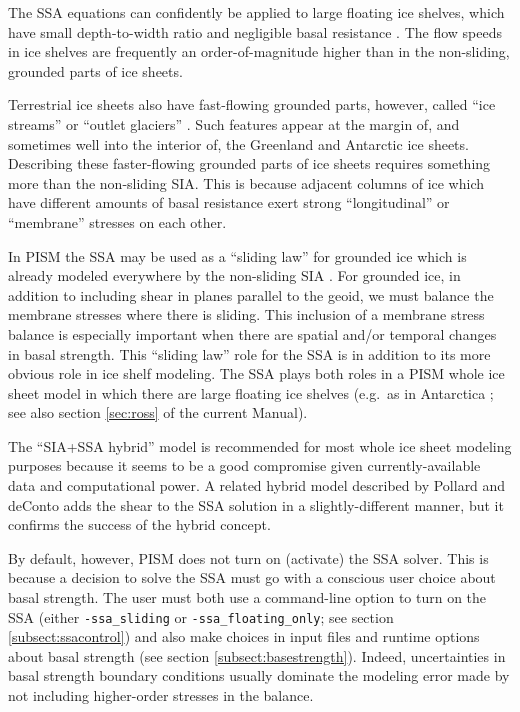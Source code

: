 The SSA equations can confidently be applied to large floating ice shelves, which have small depth-to-width ratio and negligible basal resistance \cite{Morland,MorlandZainuddin}.  The flow speeds in ice shelves are frequently an order-of-magnitude higher than in the non-sliding, grounded parts of ice sheets.

Terrestrial ice sheets also have fast-flowing grounded parts, however, called ``ice streams'' or ``outlet glaciers'' \cite{TrufferEchelmeyer}.  Such features appear at the margin of, and sometimes well into the interior of, the Greenland \cite{Joughinetal2001} and Antarctic \cite{BamberVaughanJoughin} ice sheets.  Describing these faster-flowing grounded parts of ice sheets requires something more than the non-sliding SIA.  This is because adjacent columns of ice which have different amounts of basal resistance exert strong ``longitudinal'' or ``membrane'' stresses \cite{SchoofStream} on each other.

In PISM the SSA may be used as a ``sliding law'' for grounded ice which is already modeled everywhere by the non-sliding SIA \cite{BBssasliding,Winkelmannetal2011}.  For grounded ice, in addition to including shear in planes parallel to the geoid, we must balance the membrane stresses where there is sliding.  This inclusion of a membrane stress balance is especially important when there are spatial and/or temporal changes in basal strength.  This ``sliding law'' role for the SSA is in addition to its more obvious role in ice shelf modeling.  The SSA plays both roles in a PISM whole ice sheet model in which there are large floating ice shelves (e.g.~as in Antarctica \cite{Golledgeetal2012ant,Martinetal2011,Winkelmannetal2011}; see also section \ref{sec:ross} of the current Manual).

The ``SIA+SSA hybrid'' model is recommended for most whole ice sheet modeling purposes because it seems to be a good compromise given currently-available data and computational power.  A related hybrid model described by Pollard and deConto \cite{PollardDeConto} adds the shear to the SSA solution in a slightly-different manner, but it confirms the success of the hybrid concept.

By default, however, PISM does not turn on (activate) the SSA solver.  This is because a decision to solve the SSA must go with a conscious user choice about basal strength.  The user must both use a command-line option to turn on the SSA (either \texttt{-ssa_sliding} or \texttt{-ssa_floating_only}; see section \ref{subsect:ssacontrol}) and also make choices in input files and runtime options about basal strength (see section \ref{subsect:basestrength}).  Indeed, uncertainties in basal strength boundary conditions usually dominate the modeling error made by not including higher-order stresses in the balance.  

